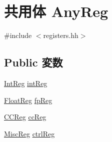 \hypertarget{unionX86ISA_1_1AnyReg}{
\section{共用体 AnyReg}
\label{unionX86ISA_1_1AnyReg}
}


{\ttfamily \#include $<$registers.hh$>$}\subsection*{Public 変数}
\begin{DoxyCompactItemize}
\item 
\hyperlink{namespaceX86ISA_a0e080577527fb3e9685399f75b5caf15}{IntReg} \hyperlink{unionX86ISA_1_1AnyReg_a5889511f36b8bd7e83c3336195dff8a4}{intReg}
\item 
\hyperlink{namespaceX86ISA_a06fae4f187c7c94b8b0046dd6802be48}{FloatReg} \hyperlink{unionX86ISA_1_1AnyReg_aca694db7faba0589c540d76f181f7068}{fpReg}
\item 
\hyperlink{namespaceX86ISA_aaefa29979e267ea80ed6b82756284354}{CCReg} \hyperlink{unionX86ISA_1_1AnyReg_aabc908271213f14969b032b383032f9c}{ccReg}
\item 
\hyperlink{namespaceX86ISA_aa16539aa6584fd12f7d6fa868f75b4de}{MiscReg} \hyperlink{unionX86ISA_1_1AnyReg_acba32419a0324334387e4359d47f595c}{ctrlReg}
\end{DoxyCompactItemize}



